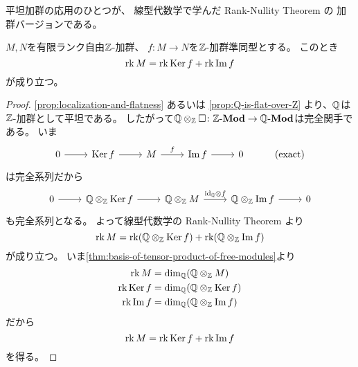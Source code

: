 \documentclass[report]{jlreq}
\begin{document}
平坦加群の応用のひとつが、
線型代数学で学んだ Rank-Nullity Theorem の
加群バージョンである。

\begin{theorem}
    $M, N$を有限ランク自由$\mathbb{Z}$-加群、
    $f \colon M \to N$を$\mathbb{Z}$-加群準同型とする。
    このとき
    \begin{equation}
        \operatorname{rk} M = \operatorname{rk}\operatorname{\mathrm{Ker}} f + \operatorname{rk}\operatorname{\mathrm{Im}} f
    \end{equation}
    が成り立つ。
\end{theorem}

\begin{proof}
    \cref{prop:localization-and-flatness}
    あるいは
    \cref{prop:Q-is-flat-over-Z}
    より、$\mathbb{Q}$は$\mathbb{Z}$-加群として平坦である。
    したがって$\mathbb{Q} \otimes_{\mathbb{Z}} \Box \colon \mathbb{Z}\text{-}\mathbf{Mod} \to \mathbb{Q}\text{-}\mathbf{Mod}$は完全関手である。
    いま
    \begin{equation}
        \begin{tikzcd}
            0 \ar{r}
                & \Ker f \ar{r}
                & M \ar{r}{f}
                & \Im f \ar{r}
                & 0
                & (\text{exact})
        \end{tikzcd}
    \end{equation}
    は完全系列だから
    \begin{equation}
        \begin{tikzcd}
            0 \ar{r}
                & \Q \otimes_\Z \Ker f \ar{r}
                & \Q \otimes_\Z M \ar{r}{\id_\Q \otimes f}
                & \Q \otimes_\Z \Im f \ar{r}
                & 0
        \end{tikzcd}
    \end{equation}
    も完全系列となる。
    よって線型代数学の Rank-Nullity Theorem より
    \begin{equation}
        \operatorname{rk} M = \operatorname{rk}(\mathbb{Q} \otimes_{\mathbb{Z}} \operatorname{\mathrm{Ker}} f) + \operatorname{rk}(\mathbb{Q} \otimes_{\mathbb{Z}} \operatorname{\mathrm{Im}} f)
    \end{equation}
    が成り立つ。
    いま\cref{thm:basis-of-tensor-product-of-free-modules}より
    \begin{alignat}{1}
        \operatorname{rk} M &= \dim_{\mathbb{Q}} (\mathbb{Q} \otimes_{\mathbb{Z}} M) \\
        \operatorname{rk}\operatorname{\mathrm{Ker}} f &= \dim_{\mathbb{Q}} (\mathbb{Q} \otimes_{\mathbb{Z}} \operatorname{\mathrm{Ker}} f) \\
        \operatorname{rk}\operatorname{\mathrm{Im}} f &= \dim_{\mathbb{Q}} (\mathbb{Q} \otimes_{\mathbb{Z}} \operatorname{\mathrm{Im}} f)
    \end{alignat}
    だから
    \begin{equation}
        \operatorname{rk} M = \operatorname{rk}\operatorname{\mathrm{Ker}} f + \operatorname{rk}\operatorname{\mathrm{Im}} f
    \end{equation}
    を得る。
\end{proof}
\end{document}
